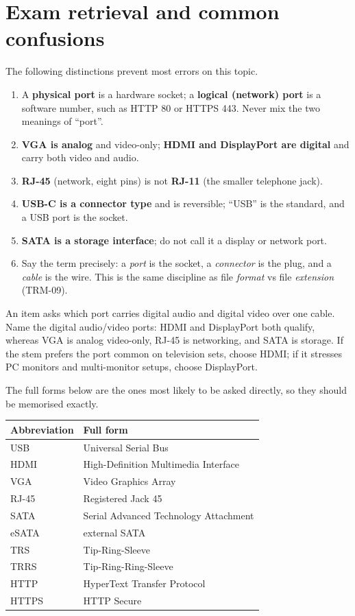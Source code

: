 \section{Exam retrieval and common confusions}
The following distinctions prevent most errors on this topic.
\begin{enumerate}
  \item A \textbf{physical port} is a hardware socket; a \textbf{logical
    (network) port} is a software number, such as HTTP 80 or HTTPS 443. Never
    mix the two meanings of ``port''.
  \item \textbf{VGA is analog} and video-only; \textbf{HDMI and DisplayPort
    are digital} and carry both video and audio.
  \item \textbf{RJ-45} (network, eight pins) is not \textbf{RJ-11} (the
    smaller telephone jack).
  \item \textbf{USB-C is a connector type} and is reversible; ``USB'' is the
    standard, and a USB port is the socket.
  \item \textbf{SATA is a storage interface}; do not call it a display or
    network port.
  \item Say the term precisely: a \emph{port} is the socket, a
    \emph{connector} is the plug, and a \emph{cable} is the wire. This is the
    same discipline as file \emph{format} vs file \emph{extension} (TRM-09).
\end{enumerate}

\begin{example}
An item asks which port carries digital audio and digital video over one
cable. Name the digital audio/video ports: HDMI and DisplayPort both qualify,
whereas VGA is analog video-only, RJ-45 is networking, and SATA is storage.
If the stem prefers the port common on television sets, choose HDMI; if it
stresses PC monitors and multi-monitor setups, choose DisplayPort.
\end{example}

The full forms below are the ones most likely to be asked directly, so they
should be memorised exactly.

\begin{center}
\begin{tabular}{p{}p{}}
\toprule
\textbf{Abbreviation} & \textbf{Full form} \\
\midrule
USB & Universal Serial Bus \\
HDMI & High-Definition Multimedia Interface \\
VGA & Video Graphics Array \\
RJ-45 & Registered Jack 45 \\
SATA & Serial Advanced Technology Attachment \\
eSATA & external SATA \\
TRS & Tip-Ring-Sleeve \\
TRRS & Tip-Ring-Ring-Sleeve \\
HTTP & HyperText Transfer Protocol \\
HTTPS & HTTP Secure \\
\bottomrule
\end{tabular}
\end{center}

